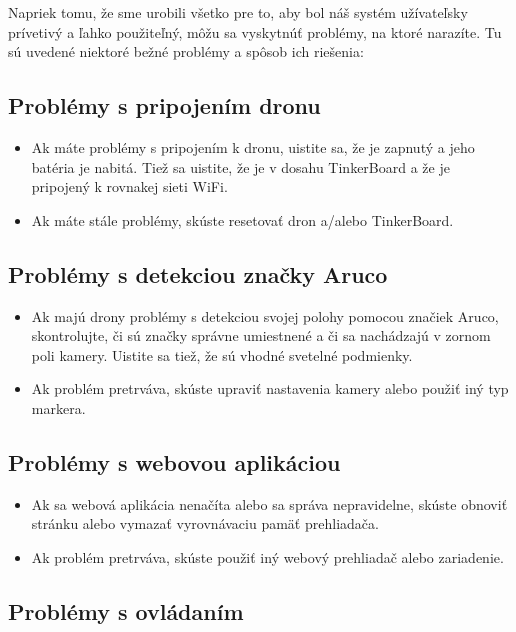 \documentclass[a4paper]{feidippp}
\begin{document}
Napriek tomu, že sme urobili všetko pre to, aby bol náš systém užívateľsky prívetivý a ľahko použiteľný, môžu sa vyskytnúť problémy, na ktoré narazíte. Tu sú uvedené niektoré bežné problémy a spôsob ich riešenia:

\subsection{Problémy s pripojením dronu}

\begin{itemize}
\item Ak máte problémy s pripojením k dronu, uistite sa, že je zapnutý a jeho batéria je nabitá. Tiež sa uistite, že je v dosahu TinkerBoard a že je pripojený k rovnakej sieti WiFi.
\item Ak máte stále problémy, skúste resetovať dron a/alebo TinkerBoard.
\end{itemize}

\subsection{Problémy s detekciou značky Aruco}

\begin{itemize}
\item Ak majú drony problémy s detekciou svojej polohy pomocou značiek Aruco, skontrolujte, či sú značky správne umiestnené a či sa nachádzajú v zornom poli kamery. Uistite sa tiež, že sú vhodné svetelné podmienky.
\item Ak problém pretrváva, skúste upraviť nastavenia kamery alebo použiť iný typ markera.
\end{itemize}

\subsection{Problémy s webovou aplikáciou}

\begin{itemize}
\item Ak sa webová aplikácia nenačíta alebo sa správa nepravidelne, skúste obnoviť stránku alebo vymazať vyrovnávaciu pamäť prehliadača.
\item Ak problém pretrváva, skúste použiť iný webový prehliadač alebo zariadenie.
\end{itemize}

\subsection{Problémy s ovládaním}
\end{document}
